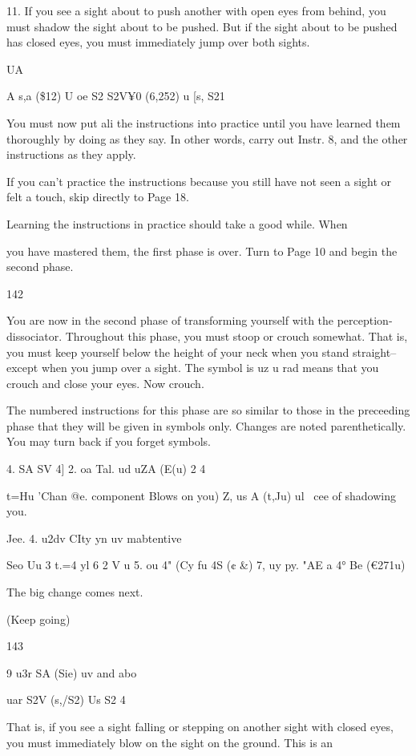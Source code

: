 \documentclass[10pt,twoside]{memoir}
\begin{document}
\begin{enumerate}
{\begin{enumerate}
\begin{sysrules}
\begin{sysrules}
\begin{sysrules}
\begin{sysrules}
{\begin{enumerate}
{{{{{{{11. If you see a sight about to push another with open eyes from 
behind, you must shadow the sight about to be pushed. But if the sight 
about to be pushed has closed eyes, you must immediately jump over both 
sights. 


UA 


A s,a (\$12) U oe S2 
S2V¥0 (6,252) u [s, S21 


You must now put ali the instructions into practice until you have 
learned them thoroughly by doing as they say. In other words, carry out 
Instr. 8, and the other instructions as they apply. 


If you can't practice the instructions because you still have not seen a 
sight or felt a touch, skip directly to Page 18. 


Learning the instructions in practice should take a good while. When 


you have mastered them, the first phase is over. Turn to Page 10 and begin 
the second phase. 


142 


You are now in the second phase of transforming yourself with the 
perception-dissociator. Throughout this phase, you must stoop or crouch 
somewhat. That is, you must keep yourself below the height of your neck 
when you stand straight-- except when you jump over a sight. The symbol is 
uz u rad means that you crouch and close your eyes. Now crouch. 


The numbered instructions for this phase are so similar to those in the 
preceeding phase that they will be given in symbols only. Changes are noted 
parenthetically. You may turn back if you forget symbols. 


4. SA SV 4] 2. oa Tal. ud 
uZA (E(u) 2 4%


t=Hu 'Chan @e. component Blows on you) 
Z, us A (t,Ju) ul \ cee of shadowing you. 


Jee. 
4. u2dv CIty yn 
uv mabtentive 


Seo Uu 
3 t.=4 yl 6 2 V u 
5. ou 4" (Cy fu 4S (¢ &) 
7, uy py. "AE a 4° Be 
(€271u) 


The big change comes next. 


(Keep going) 


143 


9 u3r SA (Sie) uv and abo 


uar S2V (s,/S2) Us S2 
4 


That is, if you see a sight falling or stepping on another sight with closed 
eyes, you must immediately blow on the sight on the ground. This is an 


}}}}}}}
\end{enumerate}}
\end{sysrules}
\end{sysrules}
\end{sysrules}
\end{sysrules}
\end{enumerate}}
\end{enumerate}
\end{document}
